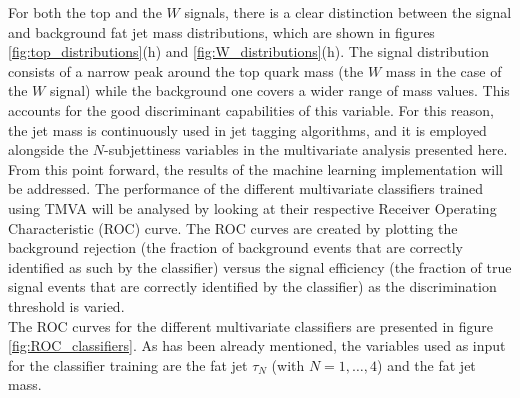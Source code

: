 \documentclass[main]{subfiles} %
\begin{document}
For both the top and the $W$ signals, there is a clear distinction between the signal and background fat jet mass distributions, which are shown in figures \ref{fig:top_distributions}(h) and \ref{fig:W_distributions}(h). The signal distribution consists of a narrow peak around the top quark mass (the $W$ mass in the case of the $W$ signal) while the background one covers a wider range of mass values. This accounts for the good discriminant capabilities of this variable. For this reason, the jet mass is continuously used in jet tagging algorithms, and it is employed alongside the $N$-subjettiness variables in the multivariate analysis presented here. \\

From this point forward, the results of the machine learning implementation will be addressed. The performance of the different multivariate classifiers trained using \textsc{TMVA} will be analysed by looking at their respective Receiver Operating Characteristic (ROC) curve. The ROC curves are created by plotting the background rejection (the fraction of background events that are correctly identified as such by the classifier) versus the signal efficiency (the fraction of true signal events that are correctly identified by the classifier) as the discrimination threshold is varied. \\

The ROC curves for the different multivariate classifiers are presented in figure \ref{fig:ROC_classifiers}. As has been already mentioned, the variables used as input for the classifier training are the fat jet $\tau_N$ (with $N = 1,\dots,4$) and the fat jet mass. \\
\end{document}
